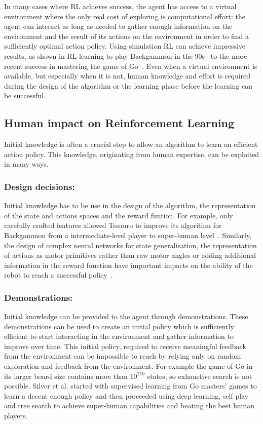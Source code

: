 \documentclass[letterpaper]{article} %
\begin{document}
In many cases where RL achieves success, the agent
has access to a virtual environment where the only real cost of exploring is 
computational effort: the agent can interact as long as needed to gather
enough information on the environment and the result of its actions on the environment in order to find a sufficiently optimal action policy. Using simulation RL can achieve impressive results, as shown in RL learning to play Backgammon in the
90s~\cite{tesauro1995temporal} to the more recent success in mastering the game
of Go~\cite{silver2016mastering}. Even when a virtual environment is available,
but especially when it is not, human knowledge and effort is required during the
design of the algorithm or the learning phase before the learning can be successful.

\subsection{Human impact on Reinforcement Learning}

Initial knowledge is often a crucial step to allow an algorithm to learn an
efficient action policy. This knowledge, originating from human expertise, can
be exploited in many ways. 

\subsubsection{Design decisions:}
Initial knowledge has to be use in the design of the algorithm, the
representation of the state and actions spaces and the reward funtion. For
example, only carefully crafted features allowed
Tesauro to improve its algorithm for Backgammon from a intermediate-level player
to super-human level~\cite{tesauro1995temporal}. Similarly, the design of
complex neural networks for state generalisation, the representation of actions
as motor primitives rather than raw motor angles or adding additional
information in the reward function have important impacts on the ability of
the robot to reach a successful policy~\cite{kober2013reinforcement}.

\subsubsection{Demonstrations:}
Initial knowledge can be provided to the agent through demonstrations.
These demonstrations can be used to create an initial policy which is sufficiently
efficient to start interacting in the environment and gather information to
improve over time. This initial policy, required to receive meaningful feedback
from the environment can be impossible to reach by relying only on random
exploration and feedback from the environment. For example the game of Go in its larger board
size contains more than $10^{210}$ states, so exhaustive search is not possible.
Silver et al. \cite{silver2016mastering} started with
supervised learning from Go masters' games to learn a decent enough policy and then
proceeded using deep learning, self play and tree search to achieve super-human
capabilities and beating the best human players.
\end{document}
